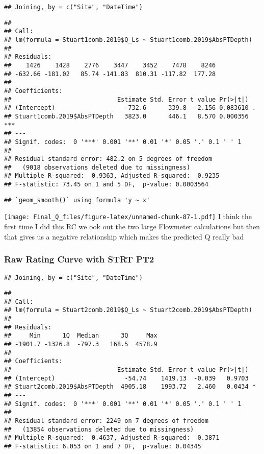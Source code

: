 \documentclass[
]{article}
\begin{document}
\begin{verbatim}
## Joining, by = c("Site", "DateTime")
\end{verbatim}

\begin{verbatim}
## 
## Call:
## lm(formula = Stuart1comb.2019$Q_Ls ~ Stuart1comb.2019$AbsPTDepth)
## 
## Residuals:
##    1426    1428    2776    3447    3452    7478    8246 
## -632.66 -181.02   85.74 -141.83  810.31 -117.82  177.28 
## 
## Coefficients:
##                             Estimate Std. Error t value Pr(>|t|)    
## (Intercept)                   -732.6      339.8  -2.156 0.083610 .  
## Stuart1comb.2019$AbsPTDepth   3823.0      446.1   8.570 0.000356 ***
## ---
## Signif. codes:  0 '***' 0.001 '**' 0.01 '*' 0.05 '.' 0.1 ' ' 1
## 
## Residual standard error: 482.2 on 5 degrees of freedom
##   (9018 observations deleted due to missingness)
## Multiple R-squared:  0.9363, Adjusted R-squared:  0.9235 
## F-statistic: 73.45 on 1 and 5 DF,  p-value: 0.0003564
\end{verbatim}

\begin{verbatim}
## `geom_smooth()` using formula 'y ~ x'
\end{verbatim}

\texttt{[image: Final\_Q\_files/figure-latex/unnamed-chunk-87-1.pdf]} I
think the first time I did this RC we ook out the two large Flowmeter
calculations but then that gives us a negative relationship which makes
the predicted Q really bad

\hypertarget{raw-rating-curve-with-strt-pt2}{%
\subsubsection{Raw Rating Curve with STRT
PT2}\label{raw-rating-curve-with-strt-pt2}}

\begin{verbatim}
## Joining, by = c("Site", "DateTime")
\end{verbatim}

\begin{verbatim}
## 
## Call:
## lm(formula = Stuart2comb.2019$Q_Ls ~ Stuart2comb.2019$AbsPTDepth)
## 
## Residuals:
##     Min      1Q  Median      3Q     Max 
## -1901.7 -1326.8  -797.3   168.5  4578.9 
## 
## Coefficients:
##                             Estimate Std. Error t value Pr(>|t|)  
## (Intercept)                   -54.74    1419.13  -0.039   0.9703  
## Stuart2comb.2019$AbsPTDepth  4905.18    1993.72   2.460   0.0434 *
## ---
## Signif. codes:  0 '***' 0.001 '**' 0.01 '*' 0.05 '.' 0.1 ' ' 1
## 
## Residual standard error: 2249 on 7 degrees of freedom
##   (13854 observations deleted due to missingness)
## Multiple R-squared:  0.4637, Adjusted R-squared:  0.3871 
## F-statistic: 6.053 on 1 and 7 DF,  p-value: 0.04345
\end{verbatim}
\end{document}
